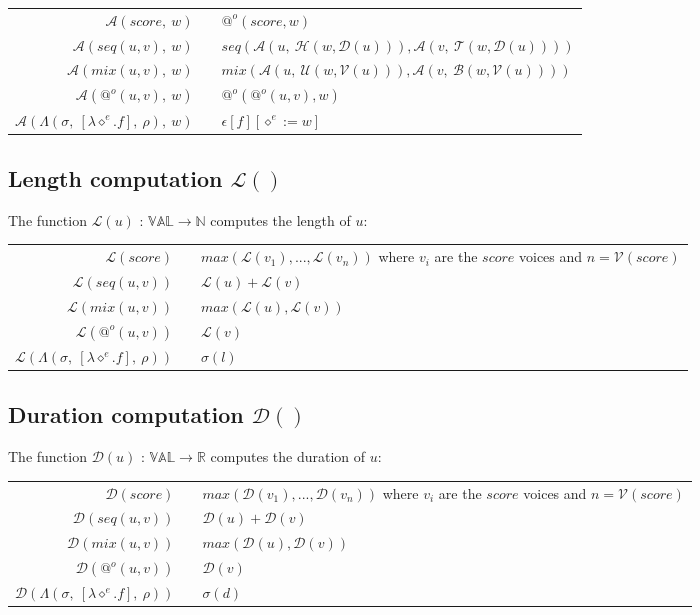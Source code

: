 \documentclass[10pt,a4paper,frenchb]{article}
\makeatletter
\newcommand{\evaltable}[1][$\rightarrow$]	  {\begin{center} \begin{tabular*}{\linewidth}{rc@{ #1 }l}}
\newcommand{\evaltablend}  		{\end{tabular*}\end{center}}
\newcommand{\var}[1]		{\ensuremath{\diamond^#1}}
\newcommand{\val}		{\ensuremath{\mathbb{VAL}}}
\newcommand{\clossym}	{\ensuremath{\Lambda}}
\newcommand{\applyop}	{\ensuremath{@}}
\newcommand{\noredex}	{\ensuremath{\applyop^o}}
\newcommand{\evalsym}			{\ensuremath{\epsilon}}
\newcommand{\envsym}				{\ensuremath{\rho}}
\newcommand{\applysym}			{\ensuremath{\mathcal A}}
\newcommand{\closure}[4]			{\ensuremath{\clossym\left(#4,\ \left[\lambdaexpr{#1}{#2}\right],\ #3 \right)}}
\newcommand{\evalss}[1]				{\ensuremath{\evalsym\left[#1\right]}}
\newcommand{\applysimple}[2]			{\ensuremath{\applysym\left(#1,\ #2\right)}}
\newcommand{\apexpr}[1] 		{#1(u, v)}
\newcommand{\lambdaexpr}[2]	{\lambda \var{#1}.#2}
\newcommand{\length}			{\ensuremath{\mathcal L}}
\newcommand{\voices}			{\ensuremath{\mathcal V}}
\newcommand{\dur}			{\ensuremath{\mathcal D}}
\newcommand{\head}			{\ensuremath{\mathcal H}}
\newcommand{\tail}			{\ensuremath{\mathcal T}}
\renewcommand{\top}			{\ensuremath{\mathcal U}}
\newcommand{\bottom}			{\ensuremath{\mathcal B}}
\newcommand{\bounds}			{\ensuremath{\sigma}}
\newcommand{\durOp}[1]		{\ensuremath{\dur\left(#1\right)}}
\newcommand{\sapplyScore}[2]				{\ensuremath{\noredex\left(#1,#2\right)}}
\newcommand{\sapplySeq}[3]				{\ensuremath{seq\left(\applysimple{#1}{\head\left(#3,\durOp{#1}\right)}, \applysimple{#2}{\tail\left(#3, \durOp{#1}\right)}\right)}}
\newcommand{\sapplyMix}[3]				{\ensuremath{mix\left(\applysimple{#1}{\top\left(#3, \voices\left(#1\right)\right)}, \applysimple{#2}{\bottom\left(#3, \voices\left(#1\right)\right)}\right)}}
\newcommand{\sapplyApply}[3]				{\ensuremath{\noredex\left(\noredex\left(#1,#2\right),#3\right)}}
\newcommand{\sapplyClosure}[3]			{\ensuremath{\evalss{#2}[\var{#1} := #3]}}
\newcommand{\lengthScore}		{\ensuremath{max\left(\length\left(v_1\right),..., \length\left(v_n\right)\right)}}
\newcommand{\lengthSeq}[2]		{\ensuremath{\length\left(#1\right) + \length\left(#2\right)}}
\newcommand{\lengthMix}[2]		{\ensuremath{max\left(\length\left(#1\right), \length\left(#2\right)\right)}}
\newcommand{\lengthClosure}[4][\envsym]		{\ensuremath{{#4}\left(l\right)}}
\newcommand{\durScore}				{\ensuremath{max\left(\durOp{v_1},..., \durOp{v_n}\right)}}
\newcommand{\durSeq}[2]				{\ensuremath{\durOp{#1} + \durOp{#2}}}
\newcommand{\durMix}[2]				{\ensuremath{max\left(\durOp{#1}, \durOp{#2}\right)}}
\newcommand{\durApply}[2]			{\ensuremath{\durOp{#2}}}
\newcommand{\durClosure}[4][\envsym]	{\ensuremath{{#4}\left(d\right)}}
\makeatother
\begin{document}
\evaltable
 \hline
 $\applysimple{score}{w}$					& & \sapplyScore{score}{w} \\
 $\applysimple{\apexpr{seq}}{w}$				& & \sapplySeq{u}{v}{w} \\
 $\applysimple{\apexpr{mix}}{w}$ 			& & \sapplyMix{u}{v}{w} \\
 $\applysimple{\noredex (u,v)}{w}$ 			& & \sapplyApply{u}{v}{w} \\
 $\applysimple{\closure{e}{f}{\envsym}{\bounds}}{w}$ 	& & \sapplyClosure{e}{f}{w} \\
 \hline
\evaltablend


\subsection{Length computation $\length()$}
The function $\length(u)$ : $\val \rightarrow \mathbb{N}$ computes the length of $u$:

\evaltable
 \hline
 $\length(score)$					& & \lengthScore \: where $v_i$ are the $score$ voices and $n=\voices(score)$ \\
 $\length(\apexpr{seq})$			& & \lengthSeq{u}{v} \\
 $\length(\apexpr{mix})$ 			& & \lengthMix{u}{v} \\
 $\length(\noredex (u,v))$ 		& & $\length(v)$ \\
 $\length(\closure{e}{f}{\envsym}{\bounds})$ 	& & \lengthClosure{e}{f}{\bounds} \\
 \hline
\evaltablend

\subsection{Duration computation $\dur()$}
The function $\dur(u)$ : $\val \rightarrow \mathbb{R}$ computes the duration of $u$:

\evaltable
 \hline
 $\dur(score)$					& & \durScore \: where $v_i$ are the $score$ voices and $n=\voices(score)$\\
 $\dur(\apexpr{seq})$			& & \durSeq{u}{v} \\
 $\dur(\apexpr{mix})$ 		& & \durMix{u}{v} \\
 $\dur(\noredex (u,v))$ 		& & \durApply{u}{v} \\
 $\dur(\closure{e}{f}{\envsym}{\bounds})$ 	& & \durClosure{e}{f}{\bounds} \\
 \hline
\evaltablend
\end{document}
